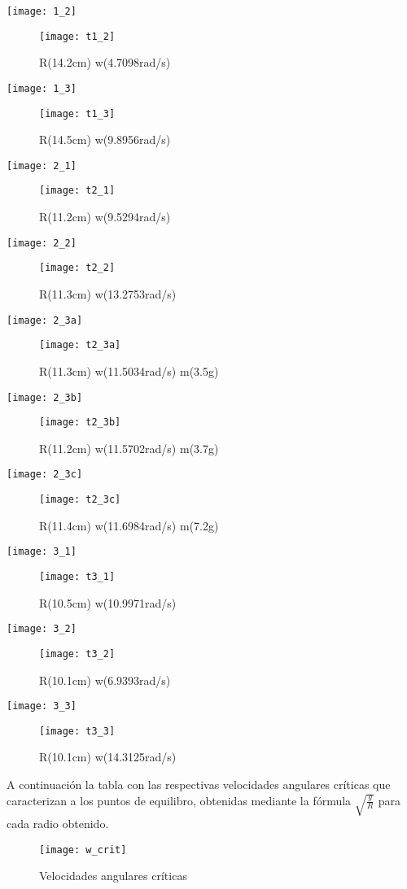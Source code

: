 \documentclass[12p]{article}
\begin{document}
\texttt{[image: 1\_2]}
\begin{figure}
	\texttt{[image: t1\_2]}
	\caption{R(14.2cm) w(4.7098rad/s)}
\end{figure}
\texttt{[image: 1\_3]}
\begin{figure}
	\texttt{[image: t1\_3]}
	\caption{R(14.5cm) w(9.8956rad/s)}
\end{figure}
\texttt{[image: 2\_1]}
\begin{figure}
	\texttt{[image: t2\_1]}
	\caption{R(11.2cm) w(9.5294rad/s)}
\end{figure}
\texttt{[image: 2\_2]}
\begin{figure}
	\texttt{[image: t2\_2]}
	\caption{R(11.3cm) w(13.2753rad/s)}
\end{figure}
\texttt{[image: 2\_3a]}
\begin{figure}
	\texttt{[image: t2\_3a]}
	\caption{R(11.3cm) w(11.5034rad/s) m(3.5g)}
\end{figure}
\texttt{[image: 2\_3b]}
\begin{figure}
	\texttt{[image: t2\_3b]}
	\caption{R(11.2cm) w(11.5702rad/s) m(3.7g)}
\end{figure}
\texttt{[image: 2\_3c]}
\begin{figure}
	\texttt{[image: t2\_3c]}
	\caption{R(11.4cm) w(11.6984rad/s) m(7.2g)}
\end{figure}
\texttt{[image: 3\_1]}
\begin{figure}
	\texttt{[image: t3\_1]}
	\caption{R(10.5cm) w(10.9971rad/s)}
\end{figure}
\texttt{[image: 3\_2]}
\begin{figure}
	\texttt{[image: t3\_2]}
	\caption{R(10.1cm) w(6.9393rad/s)}
\end{figure}
\texttt{[image: 3\_3]}
\begin{figure}
	\texttt{[image: t3\_3]}
	\caption{R(10.1cm) w(14.3125rad/s)}
\end{figure}

A continuación la tabla con las respectivas velocidades angulares críticas que caracterizan a los puntos de equilibro, obtenidas mediante la fórmula $\sqrt{\frac{g}{R}}$ para cada radio obtenido.

\begin{figure}
	\texttt{[image: w\_crit]}
	\caption{Velocidades angulares críticas}
\end{figure}
\end{document}
